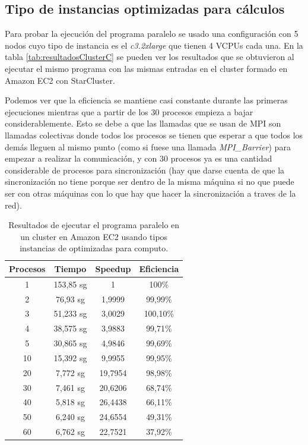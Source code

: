 \documentclass{article}
\begin{document}
\subsection{Tipo de instancias optimizadas para cálculos}
	Para probar la ejecución del programa paralelo se usado una configuración con 5 nodos cuyo tipo de instancia es el \emph{c3.2xlarge} que tienen 4 VCPUs cada una. En la tabla \ref{tab:resultadosClusterC} se pueden ver los resultados que se obtuvieron al ejecutar el mismo programa con las mismas entradas en el cluster formado en Amazon EC2 con StarCluster.

	Podemos ver que la eficiencia se mantiene casi constante durante las primeras ejecuciones mientras que  a partir de los 30 procesos empieza a bajar considerablemente. Esto se debe a que las llamadas que se usan de MPI son llamadas colectivas donde todos los procesos se tienen que esperar a que todos los demás lleguen al mismo punto (como si fuese una llamada \emph{MPI\_Barrier}) para empezar a realizar la comunicación, y con 30 procesos ya es una cantidad considerable de procesos para sincronización (hay que darse cuenta de que la sincronización no tiene porque ser dentro de la misma máquina si no que puede ser con otras máquinas con lo que hay que hacer la sincronización a traves de la red).

\begin{table}[h]
	\begin{center}
		\caption{Resultados de ejecutar el programa paralelo en un cluster en Amazon EC2 usando tipos instancias de optimizadas para computo.}
		\begin{tabular}{|c|c|c|c|}
\hline
\textbf{Procesos} &
\textbf{Tiempo} &
\textbf{Speedup} &
\textbf{Eficiencia} \\ \hline
\hline
 1 &153,85 sg &  1          & 100\% \\ \hline
 2 & 76,93 sg &  1,9999 & 99,99\% \\ \hline 
 3 & 51,233 sg &  3,0029 & 100,10\% \\ \hline 
 4 & 38,575 sg &  3,9883 & 99,71\% \\ \hline
 5 & 30,865 sg &  4,9846 & 99,69\% \\ \hline
10 & 15,392 sg &  9,9955 & 99,95\% \\ \hline
20 & 7,772 sg & 19,7954 & 98,98\% \\ \hline
30 & 7,461 sg &  20,6206& 68,74\% \\ \hline
40 & 5,818 sg & 26,4438 & 66,11\% \\ \hline
50 & 6,240 sg & 24,6554 & 49,31\% \\ \hline
60 & 6,762 sg & 22,7521 & 37,92\% \\ \hline
		\end{tabular}
		\label{tab:resultadosClusterM}
	\end{center}
\end{table}
\end{document}
